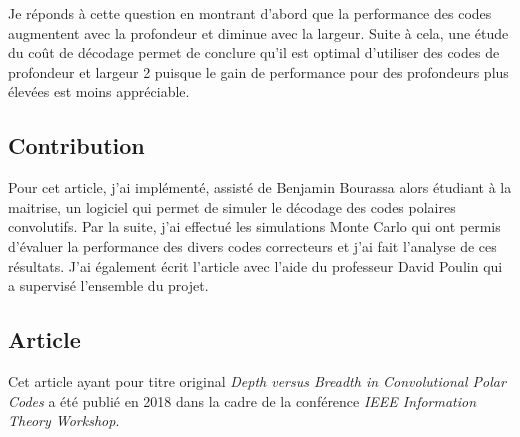 Je réponds à cette question en montrant d'abord que la performance des codes 
augmentent avec la profondeur et diminue avec la largeur.
Suite à cela, une étude du coût de décodage permet de conclure qu'il est optimal
d'utiliser des codes de profondeur et largeur 2 puisque le gain de performance 
pour des profondeurs plus élevées est moins appréciable.

\subsection{Contribution}

Pour cet article,
j'ai implémenté, 
assisté de Benjamin Bourassa alors étudiant à la maitrise,
un logiciel qui permet de simuler le décodage des codes polaires convolutifs.
Par la suite,
j'ai effectué les simulations Monte Carlo qui ont permis d'évaluer la performance
des divers codes correcteurs et j'ai fait l'analyse de ces résultats.
J'ai également écrit l'article avec l'aide du professeur David Poulin
qui a supervisé l'ensemble du projet.

\subsection{Article}

Cet article ayant pour titre original \textit{Depth versus Breadth in Convolutional Polar Codes}
a été publié en 2018 dans la cadre de la conférence \textit{IEEE Information Theory Workshop}.


